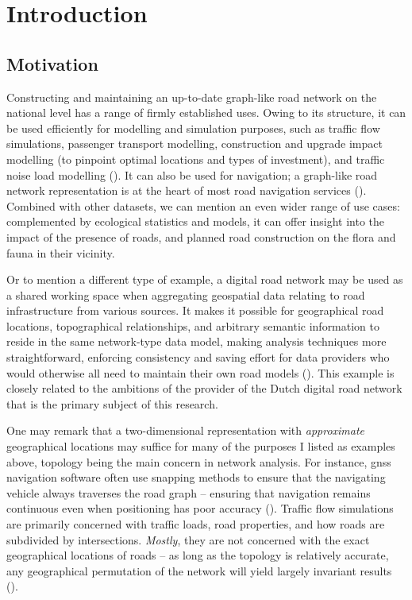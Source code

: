 
\chapter{Introduction}
\label{chap:i}

\section{Motivation}
\label{sec:motivation}

Constructing and maintaining an up-to-date graph-like road network on the national level has a range of firmly established uses. Owing to its structure, it can be used efficiently for modelling and simulation purposes, such as traffic flow simulations, passenger transport modelling, construction and upgrade impact modelling (to pinpoint optimal locations and types of investment), and traffic noise load modelling (\cite{bell_lida_1997, zhu_li_2007, zhang_2011, duran_santos_2014, peng_etal_2020}). It can also be used for navigation; a graph-like road network representation is at the heart of most road navigation services (\cite{yue_etal_2008}). Combined with other datasets, we can mention an even wider range of use cases: complemented by ecological statistics and models, it can offer insight into the impact of the presence of roads, and planned road construction on the flora and fauna in their vicinity.

Or to mention a different type of example, a digital road network may be used as a shared working space when aggregating geospatial data relating to road infrastructure from various sources. It makes it possible for geographical road locations, topographical relationships, and arbitrary semantic information to reside in the same network-type data model, making analysis techniques more straightforward, enforcing consistency and saving effort for data providers who would otherwise all need to maintain their own road models (\cite{ekpenyong_etal_2007}). This example is closely related to the ambitions of the provider of the Dutch digital road network that is the primary subject of this research.

One may remark that a two-dimensional representation with \textit{approximate} geographical locations may suffice for many of the purposes I listed as examples above, topology being the main concern in network analysis. For instance, \ac{gnss} navigation software often use snapping methods to ensure that the navigating vehicle always traverses the road graph – ensuring that navigation remains continuous even when positioning has poor accuracy (\cite{fouque_bonnifait_2008}). Traffic flow simulations are primarily concerned with traffic loads, road properties, and how roads are subdivided by intersections. \textit{Mostly}, they are not concerned with the exact geographical locations of roads – as long as the topology is relatively accurate, any geographical permutation of the network will yield largely invariant results (\cite{thomson_richardson_1995}).

